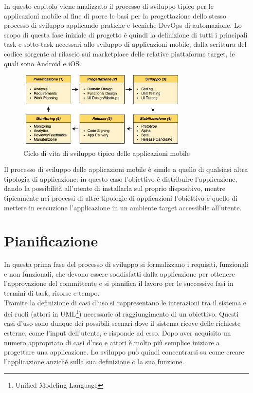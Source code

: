 
\parindent=0pt
In questo capitolo viene analizzato il processo di sviluppo tipico per le applicazioni mobile al fine di porre le basi per la progettazione dello stesso processo di sviluppo applicando pratiche e tecniche DevOps di automazione. Lo scopo di questa fase iniziale di progetto è quindi la definizione di tutti i principali task e sotto-task necessari allo sviluppo di applicazioni mobile, dalla scrittura del codice sorgente al rilascio sui marketplace delle relative piattaforme target, le quali sono Android e iOS.

\begin{figure}[H]
\centering
\includegraphics[width=0.75\textwidth]{img/tesi-2-Page-9.drawio.png}
\caption{Ciclo di vita di sviluppo tipico delle applicazioni mobile}
\end{figure}

Il processo di sviluppo delle applicazioni mobile è simile a quello di qualsiasi altra tipologia di applicazione: in questo caso l'obiettivo è distribuire l'applicazione, dando la possibilità all'utente di installarla sul proprio dispositivo, mentre tipicamente nei processi di altre tipologie di applicazioni l'obiettivo è quello di mettere in esecuzione l'applicazione in un ambiente target accessibile all'utente.

\section{Pianificazione}
In questa prima fase del processo di sviluppo si formalizzano i requisiti, funzionali e non funzionali, che devono essere soddisfatti dalla applicazione per ottenere l'approvazione del committente e si pianifica il lavoro per le successive fasi in termini di task, risorse e tempo.\\
Tramite la definizione di casi d'uso si rappresentano le interazioni tra il sistema e dei ruoli (attori in UML\footnote{Unified Modeling Language}) necessarie al raggiungimento di un obiettivo. Questi casi d'uso sono dunque dei possibili scenari dove il sistema riceve delle richieste esterne, come l'input dell'utente, e risponde ad esso.
Dopo aver acquisito un numero appropriato di casi d'uso e attori è molto più semplice iniziare a progettare una applicazione. Lo sviluppo può quindi concentrarsi su come creare l'applicazione anziché sulla sua definizione o la sua funzione.


